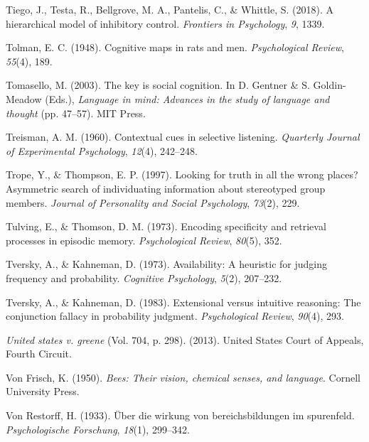 \documentclass[
]{krantz}
\newlength{\cslhangindent}
\newenvironment{CSLReferences}[2] %
 {\begin{list}{}{%
  \setlength{\itemindent}{0pt}
  \setlength{\leftmargin}{0pt}
  \setlength{\parsep}{0pt}
  \ifodd #1
   \setlength{\leftmargin}{\cslhangindent}
   \setlength{\itemindent}{-1\cslhangindent}
  \fi
  \setlength{\itemsep}{#2\baselineskip}}}
 {\end{list}}
\begin{document}
\begin{CSLReferences}{1}{0}
Tiego, J., Testa, R., Bellgrove, M. A., Pantelis, C., \& Whittle, S. (2018). A hierarchical model of inhibitory control. \emph{Frontiers in Psychology}, \emph{9}, 1339.

Tolman, E. C. (1948). Cognitive maps in rats and men. \emph{Psychological Review}, \emph{55}(4), 189.

Tomasello, M. (2003). The key is social cognition. In D. Gentner \& S. Goldin-Meadow (Eds.), \emph{Language in mind: Advances in the study of language and thought} (pp. 47--57). MIT Press.

Treisman, A. M. (1960). Contextual cues in selective listening. \emph{Quarterly Journal of Experimental Psychology}, \emph{12}(4), 242--248.

Trope, Y., \& Thompson, E. P. (1997). Looking for truth in all the wrong places? Asymmetric search of individuating information about stereotyped group members. \emph{Journal of Personality and Social Psychology}, \emph{73}(2), 229.

Tulving, E., \& Thomson, D. M. (1973). Encoding specificity and retrieval processes in episodic memory. \emph{Psychological Review}, \emph{80}(5), 352.

Tversky, A., \& Kahneman, D. (1973). Availability: A heuristic for judging frequency and probability. \emph{Cognitive Psychology}, \emph{5}(2), 207--232.

Tversky, A., \& Kahneman, D. (1983). Extensional versus intuitive reasoning: The conjunction fallacy in probability judgment. \emph{Psychological Review}, \emph{90}(4), 293.

\emph{United states v. greene} (Vol. 704, p. 298). (2013). United States Court of Appeals, Fourth Circuit.

Von Frisch, K. (1950). \emph{Bees: Their vision, chemical senses, and language}. Cornell University Press.

Von Restorff, H. (1933). {Ü}ber die wirkung von bereichsbildungen im spurenfeld. \emph{Psychologische Forschung}, \emph{18}(1), 299--342.


\end{CSLReferences}
\end{document}
